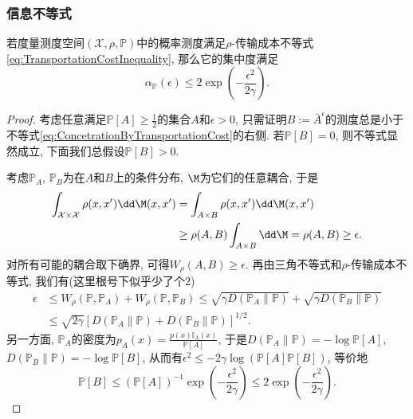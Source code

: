 \subsubsection{信息不等式}

 
\begin{theorem}
	若度量测度空间$(\mathcal{X}, \rho, \mathbb{P})$中的概率测度满足$\rho$-传输成本不等式\eqref{eq:TransportationCostInequality}, 那么它的集中度满足
	\begin{equation}\label{eq:ConcetrationByTransportationCost}
		\alpha_{\mathbb{P}}(\epsilon) \leq 2 \exp \left(- \frac{\epsilon^2}{2 \gamma} \right).
	\end{equation}
\end{theorem}
\begin{proof}
	考虑任意满足$\mathbb{P}[A] \geq \frac12$的集合$A$和$\epsilon > 0$, 只需证明$B := \bar A^{\epsilon}$的测度总是小于不等式\eqref{eq:ConcetrationByTransportationCost}的右侧. 
	若$\mathbb{P}[B] = 0$, 则不等式显然成立, 下面我们总假设$\mathbb{P}[B] > 0$. 
	
	考虑$\mathbb{P}_A$, $\mathbb{P}_B$为在$A$和$B$上的条件分布, $\M$为它们的任意耦合, 于是
	\begin{align*}
		\int_{\mathcal{X} \times \mathcal{X}} \rho(x, x') \dd \M(x, x')
		&= \int_{A \times B} \rho(x, x') \dd \M(x, x') \\
		&\geq \rho(A, B) \int_{A \times B} \dd \M 
		= \rho(A, B) 
		\geq \epsilon. 
	\end{align*}
	对所有可能的耦合取下确界, 可得$W_{\rho}(A, B) \geq \epsilon$. 
	再由三角不等式和$\rho$-传输成本不等式, 我们有(这里根号下似乎少了个2)
	\begin{align*}
		\epsilon 
		&\leq W_{\rho}(\mathbb{P}, \mathbb{P}_A) + W_{\rho}(\mathbb{P}, \mathbb{P}_B) 
		\leq \sqrt{\gamma D(\mathbb{P}_A \| \mathbb{P})} + \sqrt{\gamma D(\mathbb{P}_B \| \mathbb{P})} \\
		&\leq \sqrt{2 \gamma} \left[ D(\mathbb{P}_A \| \mathbb{P}) + D(\mathbb{P}_B \| \mathbb{P}) \right]^{1/2}.
	\end{align*}
	另一方面, $\mathbb{P}_A$的密度为$p_A(x) = \frac{p(x) \mathbb I_A(x)}{\mathbb{P}[A]}$, 于是$D(\mathbb{P}_A \| \mathbb{P}) = - \log \mathbb{P}[A]$, $D(\mathbb{P}_B \| \mathbb{P}) = -\log \mathbb{P}[B]$, 从而有$\epsilon^2 \leq -  2 \gamma \log (\mathbb{P}[A] \mathbb{P}[B])$, 等价地
	\begin{equation*}
		 \mathbb{P}[B] 
		 \leq (\mathbb{P}[A])^{-1} \exp\left(- \frac{\epsilon^2}{2 \gamma} \right) 
		 \leq 2 \exp\left(- \frac{\epsilon^2}{2 \gamma} \right). 
	\end{equation*}
\end{proof}

